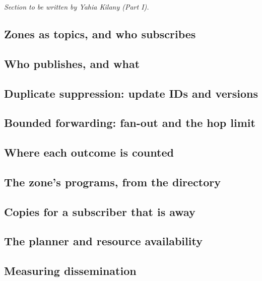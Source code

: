 
\tbd{} \emph{Section to be written by Yahia Kilany (Part I).}

\subsection{Zones as topics, and who subscribes}

\subsection{Who publishes, and what}

\subsection{Duplicate suppression: update IDs and versions}

\subsection{Bounded forwarding: fan-out and the hop limit}

\subsection{Where each outcome is counted}

\subsection{The zone's programs, from the directory}

\subsection{Copies for a subscriber that is away}

\subsection{The planner and resource availability}

\subsection{Measuring dissemination}
